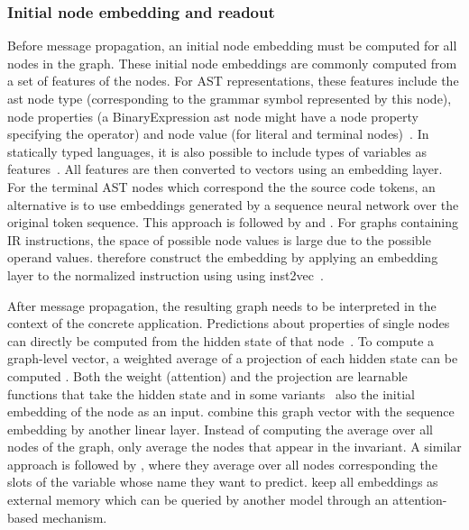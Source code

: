 \documentclass[sigconf,authordraft=true,nonacm=true]{acmart}
\begin{document}
\subsubsection{Initial node embedding and readout}
Before message propagation, an initial node embedding must be computed for all nodes in the graph.
These initial node embeddings are commonly computed from a set of features of the nodes.
For AST representations, these features include the ast node type (corresponding to the grammar symbol represented by this node), node properties (a BinaryExpression ast node might have a node property specifying the operator) and node value (for literal and terminal nodes)~\cite{allamanis_learning_2018,schrouff_inferring_2019,brauckmann_compiler-based_2020}.
In statically typed languages, it is also possible to include types of variables as features~\cite{allamanis_learning_2018}.
All features are then converted to vectors using an embedding layer.
For the terminal AST nodes which correspond the the source code tokens, an alternative is to use embeddings generated by a sequence neural network over the original token sequence.
This approach is followed by \citet{fernandes_structured_2020} and \citet{hellendoorn_global_2019}.
For graphs containing IR instructions, the space of possible node values is large due to the possible operand values.
\citet{cummins_programl_2020} therefore construct the embedding by applying an embedding layer to the normalized instruction using using inst2vec~\cite{ben-nun_neural_2018}.

After message propagation, the resulting graph needs to be interpreted in the context of the concrete application.
Predictions about properties of single nodes can directly be computed from the hidden state of that node~\cite{li_using_2019,allamanis_typilus_2020}.
To compute a graph-level vector, a weighted average of a projection of each hidden state can be computed \cite{brauckmann_compiler-based_2020,fernandes_structured_2020}.
Both the weight (attention) and the projection are learnable functions that take the hidden state and in some variants~\cite{cummins_programl_2020} also the initial embedding of the node as an input.
\citet{fernandes_structured_2020} combine this graph vector with the sequence embedding by another linear layer.
Instead of computing the average over all nodes of the graph, \citet{hellendoorn_are_2019} only average the nodes that appear in the invariant.
A similar approach is followed by \citet{allamanis_learning_2018}, where they average over all nodes corresponding the slots of the variable whose name they want to predict.
\citet{si_learning_2018} keep all embeddings as external memory which can be queried by another model through an attention-based mechanism.
\end{document}

